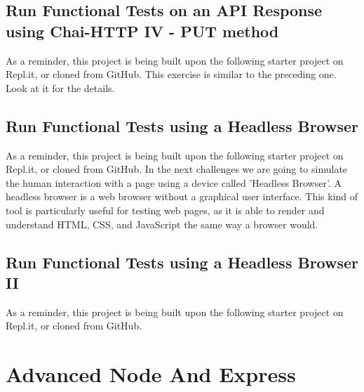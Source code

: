 \documentclass{article}%
\begin{document}
%
\subsection{Run Functional Tests on an API Response using Chai{-}HTTP IV {-} PUT method}%
\label{subsec:RunFunctionalTestsonanAPIResponseusingChai{-}HTTPIV{-}PUTmethod}%
As a reminder, this project is being built upon the following starter project on Repl.it, or cloned from GitHub.\newline%
This exercise is similar to the preceding one. Look at it for the details.\newline%

%
\subsection{Run Functional Tests using a Headless Browser}%
\label{subsec:RunFunctionalTestsusingaHeadlessBrowser}%
As a reminder, this project is being built upon the following starter project on Repl.it, or cloned from GitHub.\newline%
In the next challenges we are going to simulate the human interaction with a page using a device called 'Headless Browser'.\newline%
A headless browser is a web browser without a graphical user interface. This kind of tool is particularly useful for testing web pages, as it is able to render and understand HTML, CSS, and JavaScript the same way a browser would.\newline%

%
\subsection{Run Functional Tests using a Headless Browser II}%
\label{subsec:RunFunctionalTestsusingaHeadlessBrowserII}%
As a reminder, this project is being built upon the following starter project on Repl.it, or cloned from GitHub.\newline%

%
\newpage%
\section{Advanced Node And Express}%
\label{sec:AdvancedNodeAndExpress}%
\end{document}
